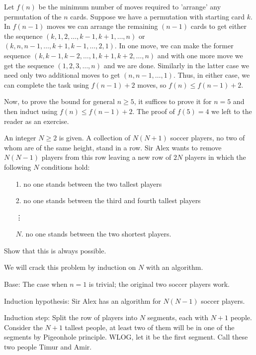 \sol Let $f(n)$ be the minimum number of moves required to 'arrange' any permutation of the $n$ cards. Suppose we have a permutation with starting card  $k$. In $f(n-1)$ moves we can arrange the remaining $(n-1)$ cards to get either the sequence $(k, 1, 2, \dots, k-1, k+1, \dots, n)$ or $(k, n, n-1, \dots, k+1, k-1, \dots, 2, 1)$. In one move, we can make the former sequence $(k, k-1, k-2, \dots, 1, k+1, k+2, \dots, n)$ and with one more move we get the sequence $(1, 2, 3, \dots, n)$ and we are done. Similarly in the latter case we need only two additional moves to get $(n, n-1, \dots, 1)$. Thus, in either case, we can complete the task using $f(n-1) + 2$ moves, so $f(n) \leq f(n-1) + 2$.

Now, to prove the bound for general $n \geq 5$, it suffices to prove it for $n=5$ and then induct using $f(n) \leq f(n-1) + 2$. The proof of $f(5)=4$ we left to the reader as an exercise.

\begin{example} [IMO 2017]
    An integer $N \ge 2$ is given. A collection of $N(N + 1)$ soccer players, no two of whom are of the same height, stand in a row. Sir Alex wants to remove $N(N - 1)$ players from this row leaving a new row of $2N$ players in which the following $N$ conditions hold:\\
    \begin{itemize}
        \item[1.] no one stands between the two tallest players
        \item[2.] no one stands between the third and fourth tallest players
        \item[] \vdots
        \item[$N$.] no one stands between the two shortest players.
    \end{itemize}
    Show that this is always possible.
\end{example}

\sol We will crack this problem by induction on $N$ with an algorithm.

Base: The case when $n = 1$ is trivial; the original two soccer players work. 

Induction hypothesis: Sir Alex has an algorithm for $N(N-1)$ soccer players. 

Induction step: Split the row of players into $N$ segments, each with $N+1$ people. Consider the $N+1$ tallest people, at least two of them will be in one of the segments by Pigeonhole principle. WLOG, let it be the first segment. Call these two people Timur and Amir.


